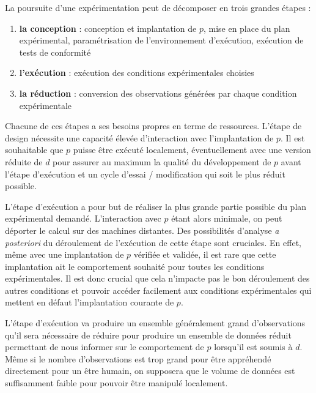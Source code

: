 La poursuite d'une expérimentation peut de décomposer en trois grandes étapes :
\begin{enumerate}
  \item \textbf{la conception} : conception et implantation de $p$, mise en place du plan expérimental, paramétrisation de l'environnement d'exécution, exécution de tests de conformité
  \item \textbf{l'exécution} : exécution des conditions expérimentales choisies
  \item \textbf{la réduction} : conversion des observations générées par chaque condition expérimentale
\end{enumerate}

Chacune de ces étapes a ses besoins propres en terme de ressources. L'étape de design nécessite une capacité élevée d'interaction avec l'implantation de $p$. Il est souhaitable que $p$ puisse être exécuté localement, éventuellement avec une version réduite de $d$ pour assurer au maximum la qualité du développement de $p$ avant l'étape d'exécution et un cycle d'essai / modification qui soit le plus réduit possible.

L'étape d'exécution a pour but de réaliser la plus grande partie possible du plan expérimental demandé. L'interaction avec $p$ étant alors minimale, on peut déporter le calcul sur des machines distantes. Des possibilités d'analyse \textit{a posteriori} du déroulement de l'exécution de cette étape sont cruciales. En effet, même avec une implantation de $p$ vérifiée et validée, il est rare que cette implantation ait le comportement souhaité pour toutes les conditions expérimentales. Il est donc crucial que cela n'impacte pas le bon déroulement des autres conditions et pouvoir accéder facilement aux conditions expérimentales qui mettent en défaut l'implantation courante de $p$.

L'étape d'exécution va produire un ensemble généralement grand d'observations qu'il sera nécessaire de réduire pour produire un ensemble de données réduit permettant de nous informer sur le comportement de $p$ lorsqu'il est soumis à $d$. Même si le nombre d'observations est trop grand pour être appréhendé directement pour un être humain, on supposera que le volume de données est suffisamment faible pour pouvoir être manipulé localement.


